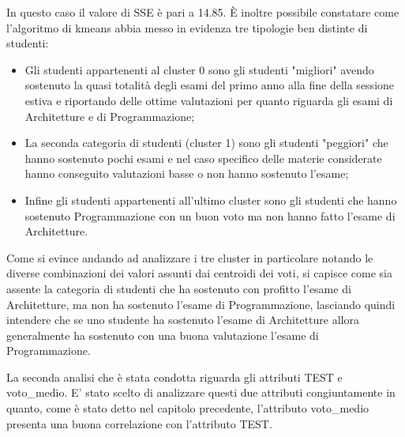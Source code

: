 \documentclass[12pt]{article}
\begin{document}
In questo caso il valore di SSE è pari a 14.85. È inoltre possibile constatare come l'algoritmo di kmeans abbia messo in evidenza tre tipologie ben distinte di studenti:
\begin{itemize}
	\item Gli studenti appartenenti al cluster 0 sono gli studenti "migliori" avendo sostenuto la quasi totalità degli esami del primo anno alla fine della sessione estiva e riportando delle ottime valutazioni per quanto riguarda gli esami di Architetture e di Programmazione;
	\item La seconda categoria di studenti (cluster 1) sono gli studenti "peggiori" che hanno sostenuto pochi esami e nel caso specifico delle materie considerate hanno conseguito valutazioni basse o non hanno sostenuto l'esame;
	\item Infine gli studenti appartenenti all'ultimo cluster sono gli studenti che hanno sostenuto Programmazione con un buon voto ma non hanno fatto l'esame di Architetture.
\end{itemize}
Come si evince andando ad analizzare i tre cluster in particolare notando le diverse combinazioni dei valori assunti dai centroidi dei voti, si capisce come sia assente la categoria di studenti che ha sostenuto con profitto l'esame di Architetture, ma non ha sostenuto l'esame di Programmazione,
lasciando quindi intendere che se uno studente ha sostenuto l'esame di Architetture allora generalmente ha sostenuto con una buona valutazione l'esame di Programmazione.




La seconda analisi che è stata condotta riguarda gli attributi TEST e voto\_medio. E' stato scelto di analizzare 
questi due attributi congiuntamente in quanto, come è stato detto nel capitolo precedente, l'attributo voto\_medio 
presenta una buona correlazione con l'attributo TEST. 
\end{document}
